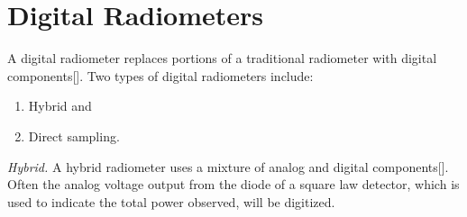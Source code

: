 
\section{Digital Radiometers}

A digital radiometer replaces portions of a traditional radiometer with digital components[\cite{Ruf}].  Two types of digital radiometers include:

\begin{enumerate}
\item Hybrid and
\item Direct sampling.
\end{enumerate}

\emph{Hybrid.}  A hybrid radiometer uses a mixture of  analog and digital components[\cite{skou}].  Often the analog voltage output from the diode of a square law detector, which is used to indicate the total power observed, will be digitized. 



